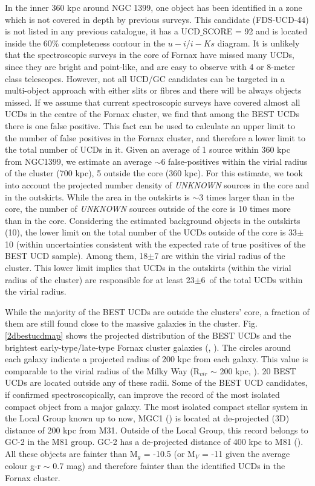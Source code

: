 \documentclass[fleqn,usenatbib]{mnras}
\begin{document}
In the inner 360 kpc around NGC 1399, one object has been identified in a zone which is not covered in depth by previous surveys. This candidate (FDS-UCD-44) is not listed in any previous catalogue, it has a UCD$\_$SCORE = 92 and is located inside the 60\% completeness contour in the $u-i$/$i-Ks$ diagram. It is unlikely that the spectroscopic surveys in the core of Fornax have missed many UCDs, since they are bright and point-like, and are easy to observe with 4 or 8-meter class telescopes. However, not all UCD/GC candidates can be targeted in a multi-object approach with either slits or fibres and there will be always objects missed.
If we assume that current spectroscopic surveys have covered almost all UCDs in the centre of the Fornax cluster, we find that among the BEST UCDs there is one false positive. This fact can be used to calculate an upper limit to the number of false positives in the Fornax cluster, and therefore a lower limit to the total number of UCDs in it. Given an average of 1 source within 360 kpc from NGC1399, we estimate an average $\sim$6 false-positives within the virial radius of the cluster (700 kpc), 5 outside the core (360 kpc). For this estimate, we took into account the projected number density of \textit{UNKNOWN} sources in the core and in the outskirts. While the area in the outskirts is $\sim$3 times larger than in the core, the number of \textit{UNKNOWN} sources outside of the core is 10 times more than in the core. Considering the estimated background objects in the outskirts (10), the lower limit on the total number of the UCDs outside of the core is 33$\pm$10 (within uncertainties consistent with the expected rate of true positives of the BEST UCD sample). Among them, 18$\pm$7 are within the virial radius of the cluster. This lower limit implies that UCDs in the outskirts (within the virial radius of the cluster) are responsible for at least 23$\pm$6\ of the total UCDs within the virial radius.

While the majority of the BEST UCDs are outside the clusters' core, a fraction of them are still found close to the massive galaxies in the cluster. Fig. \ref{2dbestucdmap} shows the projected distribution of the BEST UCDs and the brightest early-type/late-type Fornax cluster galaxies (\citealp{venhola2018}, \citealp{fcc}). The circles around each galaxy indicate a projected radius of 200 kpc from each galaxy. This value is comparable to the virial radius of the Milky Way (R$_{vir}$ $\sim$ 200 kpc, \citealp{dehnen}). 20 BEST UCDs are located outside any of these radii. Some of the BEST UCD candidates, if confirmed spectroscopically, can improve the record of the most isolated compact object from a major galaxy. The most isolated compact stellar system in the Local Group known up to now, MGC1 (\citealp{mackey}) is located at de-projected (3D) distance of 200 kpc from M31. Outside of the Local Group, this record belongs to GC-2 in the M81 group. GC-2 has a de-projected distance of 400 kpc to M81 (\citealp{jang}). All these objects are fainter than M$_g$ = -10.5 (or M$_V$ = -11 given the average colour g-r $\sim$ 0.7 mag) and therefore fainter than the identified UCDs in the Fornax cluster.
\end{document}
